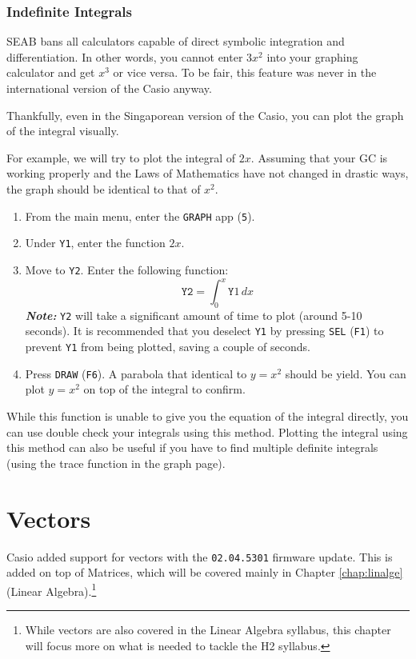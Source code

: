 \documentclass[a5paper,draft]{memoir}
\def\code#1{\texttt{#1}}
\def\note#1{\textbf{\textit{Note:}} #1}
\def\Fone{(\code{F1}) }
\def\fsix{(\code{F6})}
\begin{document}
\subsection{Indefinite Integrals}
SEAB bans all calculators capable of direct symbolic integration and differentiation. In other words, you cannot enter $3x^2$ into your graphing calculator and get $x^3$ or vice versa. To be fair, this feature was never in the international version of the Casio anyway.

Thankfully, even in the Singaporean version of the Casio, you can plot the graph of the integral visually.

For example, we will try to plot the integral of $2x$. Assuming that your GC is working properly and the Laws of Mathematics have not changed in drastic ways, the graph should be identical to that of $x^2$.

\begin{enumerate}
	\item From the main menu, enter the \code{GRAPH} app (\code{5}).
	\item Under \code{Y1}, enter the function $2x$.
	\item Move to \code{Y2}. Enter the following function:
	\begin{equation*}
	\code{Y2}=\int_{0}^{x} \code{Y}1 \, dx
	\end{equation*}
	\note{\code{Y2} will take a significant amount of time to plot (around 5-10 seconds). It is recommended that you deselect \code{Y1} by pressing \code{SEL} \Fone to prevent \code{Y1} from being plotted, saving a couple of seconds.}
	\item Press \code{DRAW} \fsix. A parabola that identical to $y=x^2$ should be yield. You can plot $y=x^2$ on top of the integral to confirm.
\end{enumerate}

While this function is unable to give you the equation of the integral directly, you can use double check your integrals using this method. Plotting the integral using this method can also be useful if you have to find multiple definite integrals (using the trace function in the graph page).

\chapter{Vectors} \label{vectors}

Casio added support for vectors with the \code{02.04.5301} firmware update. This is added on top of Matrices, which will be covered mainly in Chapter \ref{chap:linalge} (Linear Algebra).\footnote{While vectors are also covered in the Linear Algebra syllabus, this chapter will focus more on what is needed to tackle the H2 syllabus.}
\end{document}
